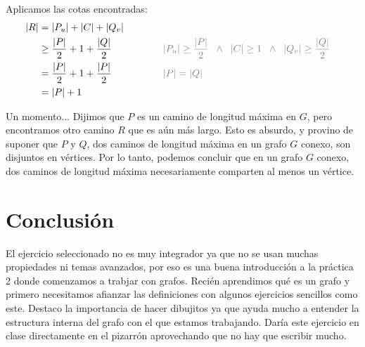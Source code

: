 Aplicamos las cotas encontradas:
\begin{alignat*}{2}
    |R| &= |P_u| + |C| + |Q_v| \\
    &\geq \frac{|P|}{2} + 1 + \frac{|Q|}{2} && \hspace{3em} \textcolor{gray}{|P_u| \geq \frac{|P|}{2} \;\;\land \;\; |C| \geq 1 \;\;\land \;\; |Q_v| \geq \frac{|Q|}{2}} \\
    &= \frac{|P|}{2} + 1 + \frac{|P|}{2} && \hspace{3em} \textcolor{gray}{|P| = |Q|} \\
    &= |P| + 1
\end{alignat*}

Un momento... Dijimos que $P$ es un camino de longitud máxima en $G$, pero encontramos otro camino $R$ que es aún más largo. Esto es absurdo, y provino de suponer que $P$ y $Q$, dos caminos de longitud máxima en un grafo $G$ conexo, son disjuntos en vértices. Por lo tanto, podemos concluir que en un grafo $G$ conexo, dos caminos de longitud máxima necesariamente comparten al menos un vértice.

\section*{Conclusión}

El ejercicio seleccionado no es muy integrador ya que no se usan muchas propiedades ni temas avanzados, por eso es una buena introducción a la práctica 2 donde comenzamos a trabjar con grafos. Recién aprendimos qué es un grafo y primero necesitamos afianzar las definiciones con algunos ejercicios sencillos como este. Destaco la importancia de hacer dibujitos ya que ayuda mucho a entender la estructura interna del grafo con el que estamos trabajando. Daría este ejercicio en clase directamente en el pizarrón aprovechando que no hay que escribir mucho.


